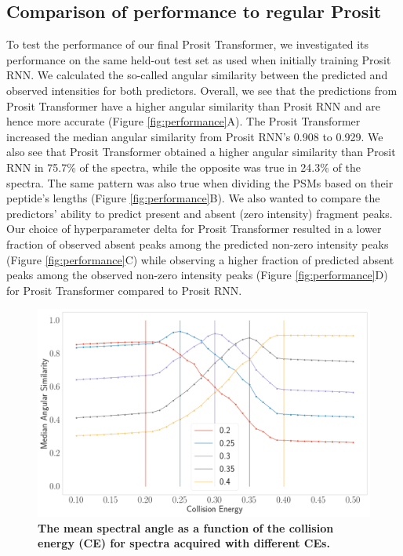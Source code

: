 \documentclass[10pt,a4paper]{article}
\begin{document}
\subsection*{Comparison of performance to regular Prosit}
    

To test the performance of our final Prosit Transformer, we investigated its performance on the same held-out test set as used when initially training Prosit RNN. We calculated the so-called angular similarity between the predicted and observed intensities for both predictors. Overall, we see that the predictions from Prosit Transformer have a higher angular similarity than Prosit RNN and are hence more accurate (Figure \ref{fig:performance}A). The Prosit Transformer increased the median angular similarity from Prosit RNN’s 0.908 to 0.929. We also see that Prosit Transformer obtained a higher angular similarity than Prosit RNN in 75.7\% of the spectra, while the opposite was true in 24.3\% of the spectra. The same pattern was also true when dividing the PSMs based on their peptide’s lengths (Figure \ref{fig:performance}B). We also wanted to compare the predictors’ ability to predict present and absent (zero intensity) fragment peaks.  Our choice of hyperparameter delta for Prosit Transformer resulted in a lower fraction of observed absent peaks among the predicted non-zero intensity peaks (Figure \ref{fig:performance}C) while observing a higher fraction of predicted absent peaks among the observed non-zero intensity peaks (Figure \ref{fig:performance}D) for Prosit Transformer compared to Prosit RNN.



\begin{figure}[ht!]
    \centering
    \includegraphics[width=12cm]{./img/ce_calibration.png}
    \caption{{\bf The mean spectral angle as a function of the collision energy (CE) for spectra acquired with different CEs.}\label{fig:ce}}
\end{figure}
\end{document}
